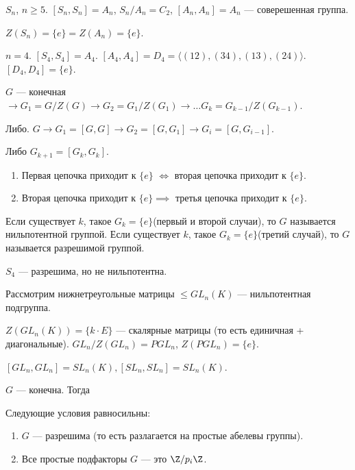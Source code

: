 \begin{example}
    $S_n$,  $n \ge 5$.
    $[S_n, S_n] = A_n$,  $S_n / A_n = C_2$,  $[A_n, A_n] = A_n$ --- соверешенная группа.

     $Z(S_n) = \{e\} = Z(A_n) = \{e\}$.

     $n = 4$.  $[S_4, S_4] = A_4$.  $[A_4, A_4] = D_4 = \langle (12), (34), (13), (24) \rangle$. $[D_4, D_4] = \{e\}$.
\end{example}
\begin{example}
    $G$ --- конечная  $\to G_1 =G / Z(G) \to G_2 = G_1 / Z(G_1) \to \ldots G_k = G_{k-1} / Z(G_{k-1})$.

    Либо. $G \to G_1 = [G, G] \to G_2 = [G, G_1] \to G_i = [G, G_{i-1}]$.

    Либо $G_{k+1} = [G_k, G_k]$.
\end{example}
\begin{statement}
    \begin{enumerate}
        \item Первая цепочка приходит к $\{e\}$ $\iff$ вторая цепочка приходит к $\{e\}$.
        \item Вторая цепочка приходит к $\{e\} \implies$ третья цепочка приходит к  $\{e\}$.
    \end{enumerate}

    Если существует $k$, такое  $G_k = \{e\}$(первый и второй случаи), то  $G$ называется нильпотентной группой.
    Если существует $k$, такое  $G_k = \{e\}$(третий случай), то  $G$ называется разрешимой группой.
\end{statement}
\begin{example}
    $S_4$ --- разрешима, но не нильпотентна.
\end{example}
\begin{example}
    Рассмотрим нижнетреугольные матрицы $\le GL_n(K)$  --- нильпотентная подгруппа.

    $Z(GL_n(K)) = \{k\cdot E\}$ --- скалярные матрицы (то есть единичная + диагональные).  $GL_n / Z(GL_n) = PGL_n$,  $Z(PGL_n) = \{e\}$.

     $[GL_n, GL_n] = SL_n(K), [SL_n, SL_n] = SL_n(K)$.
\end{example}
\begin{theorem}
    $G$ --- конечна. Тогда

    Следующие условия равносильны:
    \begin{enumerate}
        \item $G$ --- разрешима (то есть разлагается на простые абелевы группы).
        \item Все простые подфакторы $G$ --- это  $\Z / p_i \Z$.
    \end{enumerate}
\end{theorem}
